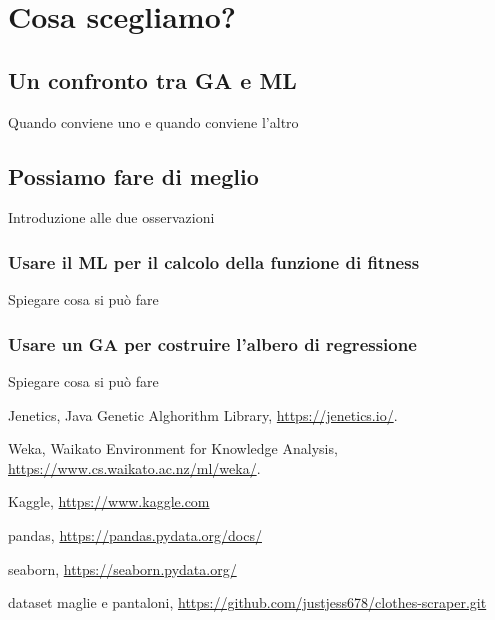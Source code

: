 \documentclass[a4paper, 11pt, oneside]{report}
\begin{document}
        \chapter{Cosa scegliamo?}
            \section{Un confronto tra GA e ML}
                Quando conviene uno e quando conviene l'altro
            \section{Possiamo fare di meglio}
                Introduzione alle due osservazioni
                \subsection{Usare il ML per il calcolo della funzione di fitness}
                Spiegare cosa si può fare
                \subsection{Usare un GA per costruire l'albero di regressione}
                Spiegare cosa si può fare


    \begin{thebibliography}{9} %
        Jenetics, Java Genetic Alghorithm Library,
        \url{https://jenetics.io/}.

        Weka, Waikato Environment for Knowledge Analysis,
        \url{https://www.cs.waikato.ac.nz/ml/weka/}.

        Kaggle,
        \url{https://www.kaggle.com}

        pandas,
        \url{https://pandas.pydata.org/docs/}

        seaborn,
        \url{https://seaborn.pydata.org/}

        dataset maglie e pantaloni,
        \url{https://github.com/justjess678/clothes-scraper.git}
    \end{thebibliography}
\end{document}
